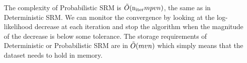 The complexity of Probabilistic SRM is $\tilde{O}(\mathrm{n_{iter}} mpvn)$, the same as in
Deterministic SRM.
We can monitor the convergence by looking at the log-likelihood decrease at each iteration
and stop the algorithm when the magnitude of the decrease is below some
tolerance.
The storage requirements of Deterministic or Probabilistic SRM are in
$\tilde{O}(mvn)$ which simply means that the dataset needs to hold in memory.







